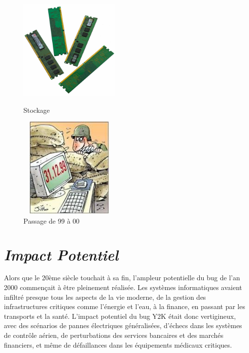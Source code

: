 \documentclass[12pt,a4paper]{article}
\begin{document}
\begin{figure}[htbp]
  \centering
  \begin{minipage}[b]{0.45\textwidth}
    \centering
    \includegraphics[width=5cm, height=5cm]{./images/ram.jpg}
    \caption{Stockage}
    \label{fig:image1}
  \end{minipage}
  \hfill
  \begin{minipage}[b]{0.45\textwidth}
    \centering
    \includegraphics[width=5cm, height=5cm]{./images/bug4.jpg}
    \caption{Passage de 99 à 00}
    \label{fig:image2}
  \end{minipage}
\end{figure}



\newpage
\section{\textit{Impact Potentiel}}
Alors que le 20ème siècle touchait à sa fin, l'ampleur potentielle du bug de l'an 2000 commençait à être pleinement réalisée. Les systèmes informatiques avaient infiltré presque tous les aspects de la vie moderne, de la gestion des infrastructures critiques comme l'énergie et l'eau, à la finance, en passant par les transports et la santé. L'impact potentiel du bug Y2K\cite{y2k} était donc vertigineux, avec des scénarios de pannes électriques généralisées, d'échecs dans les systèmes de contrôle aérien, de perturbations des services bancaires et des marchés financiers, et même de défaillances dans les équipements médicaux critiques. \\
\end{document}
